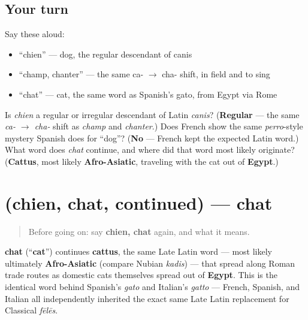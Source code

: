 \subsection*{Your turn}
Say these aloud:

\begin{itemize}
\raggedright
  \item \textquotedblleft{}chien\textquotedblright{} — dog, the regular descendant of canis
  \item \textquotedblleft{}champ, chanter\textquotedblright{} — the same ca- $\to$ cha- shift, in field and to sing
  \item \textquotedblleft{}chat\textquotedblright{} — cat, the same word as Spanish's gato, from Egypt via Rome
\end{itemize}

\begin{tcolorbox}[breakable,colback=teal!4,colframe=teal!35!black,title={Before you move on}]
Is \emph{chien} a regular or irregular descendant of Latin \emph{canis}? (\textbf{Regular} — the same \emph{ca- $\to$ cha-} shift as \emph{champ} and \emph{chanter}.) Does French show the same \emph{perro}-style mystery Spanish does for \textquotedblleft{}dog\textquotedblright{}? (\textbf{No} — French kept the expected Latin word.) What word does \emph{chat} continue, and where did that word most likely originate? (\textbf{Cattus}, most likely \textbf{Afro-Asiatic}, traveling with the cat out of \textbf{Egypt}.)
\end{tcolorbox}
\section[(chien, chat, continued)]{(chien, chat, continued) — chat}

\label{lesson:FR-C22-chien-chat-more}



\begin{quote}
Before going on: say \textbf{chien, chat} again, and what it means.
\end{quote}

\begin{cousinweb}
\textbf{chat} (\textquotedblleft{}\textbf{cat}\textquotedblright{}) continues \textbf{cattus}, the same Late Latin word — most likely ultimately \textbf{Afro-Asiatic} (compare Nubian \emph{kadis}) — that spread along Roman trade routes as domestic cats themselves spread out of \textbf{Egypt}. This is the identical word behind Spanish's \emph{gato} and Italian's \emph{gatto} — French, Spanish, and Italian all independently inherited the exact same Late Latin replacement for Classical \emph{fēlēs}.
\end{cousinweb}


